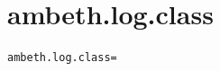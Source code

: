 \section{ambeth.log.class}
\label{configuration:AmbethLogClass}
\ClearAPI
\TODO%
\begin{lstlisting}[style=Props,caption={Usage example for \textit{ambeth.log.class}}]
ambeth.log.class=
\end{lstlisting}